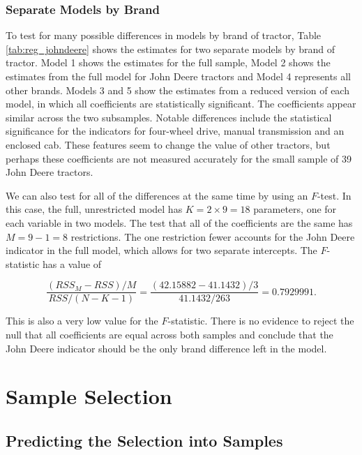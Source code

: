 \documentclass[11pt]{paper}
\begin{document}
\subsubsection{Separate Models by Brand}

To test for many possible differences in 
models by brand of tractor, 
Table \ref{tab:reg_johndeere}
shows the estimates for two separate models
by brand of tractor.
%
Model 1 shows the estimates for 
the full sample,
Model 2 shows the estimates from the full model for 
John Deere tractors
and Model 4 
represents all other brands. 
% 
Models 3 and 5 show the estimates from a reduced version of each model, 
in which all coefficients are statistically significant. 
% 
The coefficients appear similar across the two subsamples.
Notable differences include the statistical significance for 
the indicators for four-wheel drive, 
manual transmission and an enclosed cab. 
These features seem to change the value of 
other tractors, but perhaps these coefficients are not measured 
accurately for the small sample of 39 
John Deere tractors. 



We can also test for all of the differences at the same time
by using an $F$-test. 
In this case, the full, unrestricted model has $K = 2\times9 = 18$ parameters, one for each variable in two models. 
The test that all of the coefficients are the same has $M = 9 - 1 = 8$
restrictions. 
The one restriction fewer accounts for the John Deere indicator
in the full model, 
which allows for two separate intercepts. 
% 
The $F$-statistic has a value of 

$$ 
\frac{(RSS_M - RSS)/M}{RSS/(N - K - 1)} = \frac{(42.15882 - 41.1432)/3}{41.1432/263} = 0.7929991. 
$$

This is also a very low value for the $F$-statistic. 
There is no evidence to reject the null that all 
coefficients are equal across both samples 
and conclude that the John Deere indicator
should be the only brand difference left in the model. 



\clearpage
\section{Sample Selection}


\subsection{Predicting the Selection into Samples}
\end{document}
